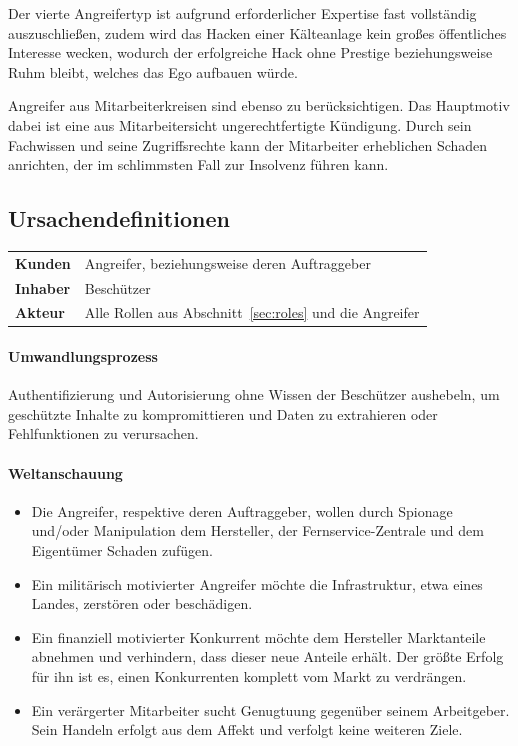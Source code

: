 \documentclass[11pt,a4paper]{report}
\begin{document}
Der vierte Angreifertyp ist aufgrund erforderlicher Expertise fast vollständig auszuschließen, zudem wird das Hacken einer Kälteanlage kein großes öffentliches Interesse wecken, wodurch der erfolgreiche Hack ohne Prestige beziehungsweise Ruhm bleibt, welches das Ego aufbauen würde. 

Angreifer aus Mitarbeiterkreisen sind ebenso zu berücksichtigen. Das Hauptmotiv dabei ist eine aus Mitarbeitersicht ungerechtfertigte Kündigung. Durch sein Fachwissen und seine Zugriffsrechte kann der Mitarbeiter erheblichen Schaden anrichten, der im schlimmsten Fall zur Insolvenz führen kann.

\subsection{Ursachendefinitionen}

\begin{table}[h] %
\begin{tabularx}{\linewidth}{@{}lX@{}}
\textbf{Kunden} & Angreifer, beziehungsweise deren Auftraggeber\\
\textbf{Inhaber} & Beschützer\\
\textbf{Akteur} & Alle Rollen aus Abschnitt~\ref{sec:roles} und die Angreifer\\
\end{tabularx}
\end{table}

\paragraph{Umwandlungsprozess} Authentifizierung und Autorisierung ohne Wissen der Beschützer aushebeln, um geschützte Inhalte zu kompromittieren und Daten zu extrahieren oder Fehlfunktionen zu verursachen.

\paragraph{Weltanschauung} 

\begin{itemize}[leftmargin=*]
\item Die Angreifer, respektive deren Auftraggeber, wollen durch Spionage und/oder Manipulation dem Hersteller, der Fernservice-Zentrale und dem Eigentümer Schaden zufügen. 
\item Ein militärisch motivierter Angreifer möchte die Infrastruktur, etwa eines Landes, zerstören oder beschädigen. 
\item Ein finanziell motivierter Konkurrent möchte dem Hersteller Marktanteile abnehmen und verhindern, dass dieser neue Anteile erhält. Der größte Erfolg für ihn ist es, einen Konkurrenten komplett vom Markt zu verdrängen. 
\item Ein verärgerter Mitarbeiter sucht Genugtuung gegenüber seinem Arbeitgeber. Sein Handeln erfolgt aus dem Affekt und verfolgt keine weiteren Ziele.
\end{itemize}
\end{document}
